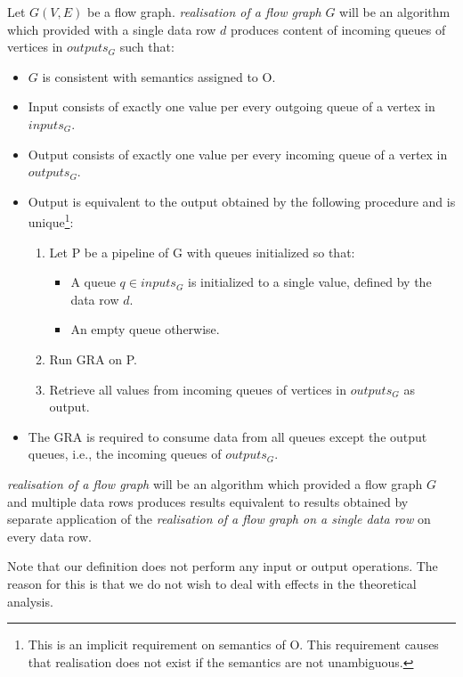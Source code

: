   Let $G(V,E)$ be a flow graph. \emph{realisation of a flow graph} $G$ will be an algorithm which provided with a single data row $d$ produces content of incoming queues of vertices in $outputs_G$ such that: 
  \begin{itemize}
    \item $G$ is consistent with semantics assigned to O.
    \item Input consists of exactly one value per every outgoing queue of a vertex in $inputs_G$.
    \item Output consists of exactly one value per every incoming queue of a vertex in $outputs_G$.
    \item Output is equivalent to the output obtained by the following procedure and is unique\footnote{This is an implicit requirement on semantics of O. This requirement causes that realisation does not exist if the semantics are not unambiguous.}:
    \begin{enumerate}
      \item Let P be a pipeline of G with queues initialized so that:
      \begin{itemize}
        \item A queue $q \in inputs_G$ is initialized to a single value, defined by the data row $d$.
        \item An empty queue otherwise.
      \end{itemize}
      \item Run GRA on P.
      \item Retrieve all values from incoming queues of vertices in $outputs_G$ as output.
    \end{enumerate}
    \item The GRA is required to consume data from all queues except the output queues, i.e., the incoming queues of $outputs_G$.
  \end{itemize}
\myenddef


  \emph{realisation of a flow graph} will be an algorithm which provided a flow graph $G$ and multiple data rows produces results equivalent to results obtained by separate application of the \emph{realisation of a flow graph on a single data row} on every data row.
\myenddef


Note that our definition does not perform any input or output operations. The reason for this is that we do not wish to deal with effects in the theoretical analysis.


